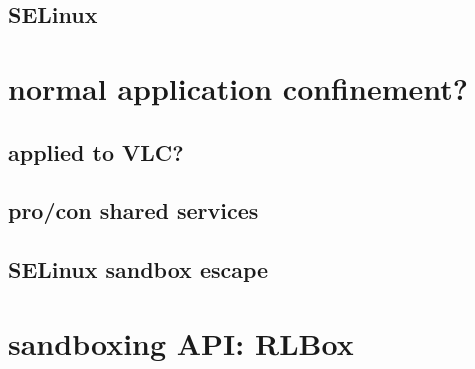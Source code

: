 
\subsection{SELinux}

\section{normal application confinement?}


\subsection{applied to VLC?}



\subsection{pro/con shared services}



\subsection{SELinux sandbox escape}


\section{sandboxing API: RLBox}



%
